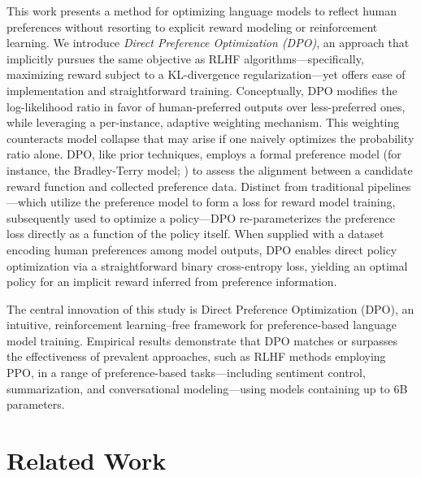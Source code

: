 This work presents a method for optimizing language models to reflect human preferences without resorting to explicit reward modeling or reinforcement learning. We introduce \textit{{Direct Preference Optimization} (DPO)}, an approach that implicitly pursues the same objective as RLHF algorithms—specifically, maximizing reward subject to a KL-divergence regularization—yet offers ease of implementation and straightforward training. Conceptually, DPO modifies the log-likelihood ratio in favor of human-preferred outputs over less-preferred ones, while leveraging a per-instance, adaptive weighting mechanism. This weighting counteracts model collapse that may arise if one naively optimizes the probability ratio alone. DPO, like prior techniques, employs a formal preference model (for instance, the Bradley-Terry model; \cite{bradley1952rankanalysis}) to assess the alignment between a candidate reward function and collected preference data. Distinct from traditional pipelines—which utilize the preference model to form a loss for reward model training, subsequently used to optimize a policy—DPO re-parameterizes the preference loss directly as a function of the policy itself. When supplied with a dataset encoding human preferences among model outputs, DPO enables direct policy optimization via a straightforward binary cross-entropy loss, yielding an optimal policy for an implicit reward inferred from preference information.

The central innovation of this study is Direct Preference Optimization (DPO), an intuitive, reinforcement learning–free framework for preference-based language model training. Empirical results demonstrate that DPO matches or surpasses the effectiveness of prevalent approaches, such as RLHF methods employing PPO, in a range of preference-based tasks—including sentiment control, summarization, and conversational modeling—using models containing up to 6B parameters.

\section{Related Work}

